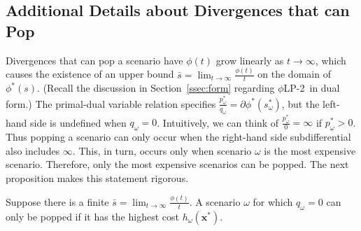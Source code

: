 \documentclass[opre,nonblindrev]{informs3} %
\newcommand{\x}{\mathbf{x}}
\newcommand{\plp}{$\phi$LP-2}
\begin{document}

\subsection{Additional Details about Divergences that can Pop}
\label{ssec:pop}

Divergences that can pop a scenario have $\phi(t)$ grow linearly as $t \rightarrow \infty$, which causes the existence of an upper bound $\bar{s} = \lim_{t \rightarrow \infty} \frac{\phi(t)}{t}$ on the domain of $\phi^*(s)$.
(Recall the discussion in Section~\ref{ssec:form} regarding \plp\ in dual form.)
The primal-dual variable relation specifies $\frac{p^*_\omega}{q_\omega} = \partial \phi^*(s^*_\omega)$, but the left-hand side is undefined when $q_\omega = 0$.
Intuitively, we can think of $\frac{p^*_\omega}{0} = \infty$ if $p^*_\omega > 0$. 
Thus popping a scenario can only occur when the right-hand side subdifferential also includes $\infty$.
This, in turn, occurs only when scenario $\omega$ is the most expensive scenario. 
Therefore, only the most expensive scenarios can be popped. 
The next proposition makes this statement rigorous.

\begin{proposition} \label{prop:pop}
	Suppose there is a finite $\bar{s} = \lim_{t \rightarrow \infty} \frac{\phi(t)}{t}$.
	A scenario $\omega$ for which $q_\omega = 0$ can only be popped if 
it has the highest cost $h_\omega(\x^*)$. 
\end{proposition}
\end{document}

